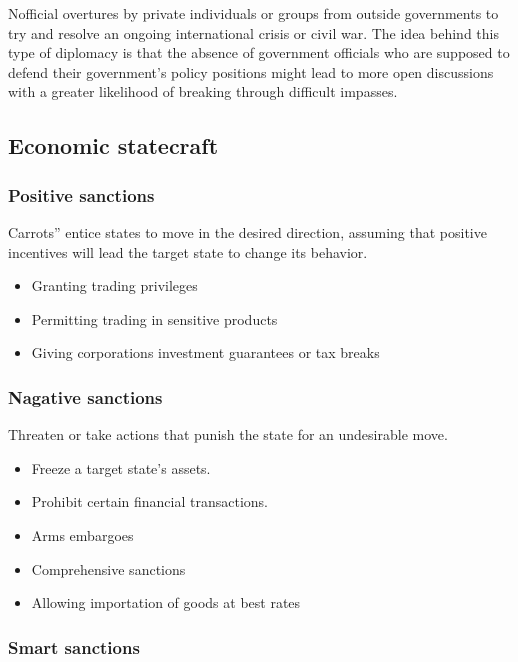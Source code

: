 \documentclass[
]{book}
\begin{document}
Nofficial overtures by private individuals or groups from outside governments to try and resolve an ongoing international crisis or civil war. The idea behind this type of diplomacy is that the absence of government officials who are supposed to defend their government's policy positions might lead to more open discussions with a greater likelihood of breaking through difficult impasses.

\hypertarget{economic-statecraft}{%
\subsection{Economic statecraft}\label{economic-statecraft}}

\hypertarget{positive-sanctions}{%
\subsubsection{Positive sanctions}\label{positive-sanctions}}

Carrots'' entice states to move in the desired direction, assuming that positive incentives will lead the target state to change its behavior.

\begin{itemize}
\item
  Granting trading privileges
\item
  Permitting trading in sensitive products
\item
  Giving corporations investment guarantees or tax breaks
\end{itemize}

\hypertarget{nagative-sanctions}{%
\subsubsection{Nagative sanctions}\label{nagative-sanctions}}

Threaten or take actions that punish the state for an undesirable move.

\begin{itemize}
\item
  Freeze a target state's assets.
\item
  Prohibit certain financial transactions.
\item
  Arms embargoes
\item
  Comprehensive sanctions
\item
  Allowing importation of goods at best rates
\end{itemize}

\hypertarget{smart-sanctions}{%
\subsubsection{Smart sanctions}\label{smart-sanctions}}
\end{document}
